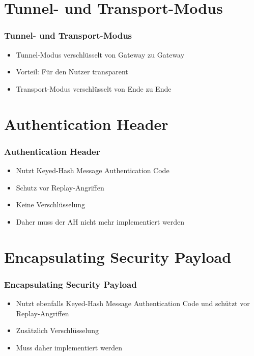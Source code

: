 \documentclass[t]{beamer}
\begin{document}
\section{Tunnel- und Transport-Modus}
\begin{frame}
	\frametitle{Tunnel- und Transport-Modus}
	\begin{itemize}
		\vfill
		\item Tunnel-Modus verschlüsselt von Gateway zu Gateway
		\item Vorteil: Für den Nutzer transparent
		\vfill
		\item Transport-Modus verschlüsselt von Ende zu Ende %
		\vfill
	\end{itemize}
\end{frame}

\section{Authentication Header}
\begin{frame}
	\frametitle{Authentication Header}
	\begin{itemize}
		\vfill
		\item Nutzt Keyed-Hash Message Authentication Code
		\vfill
		\item Schutz vor Replay-Angriffen
		\vfill
		\item Keine Verschlüsselung
		\vfill
		\item Daher muss der AH nicht mehr implementiert werden
		\vfill
	\end{itemize}
\end{frame}

\section{Encapsulating Security Payload}
\begin{frame}
	\frametitle{Encapsulating Security Payload}
	\begin{itemize}
		\vfill
		\item Nutzt ebenfalls Keyed-Hash Message Authentication Code und schützt vor Replay-Angriffen
		\vfill
		\item Zusätzlich Verschlüsselung
		\vfill
		\item Muss daher implementiert werden
		\vfill
	\end{itemize}
\end{frame}
\end{document}
